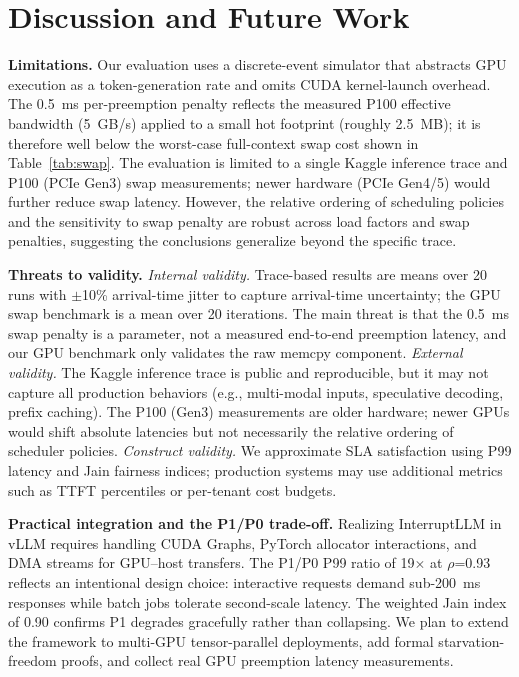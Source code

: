 \documentclass[conference]{IEEEtran}
\begin{document}
\section{Discussion and Future Work}\label{sec:discussion}

\textbf{Limitations.} Our evaluation uses a discrete-event simulator that abstracts GPU execution as a token-generation rate and omits CUDA kernel-launch overhead. The 0.5~ms per-preemption penalty reflects the measured P100 effective bandwidth (5~GB/s) applied to a small hot footprint (roughly 2.5~MB); it is therefore well below the worst-case full-context swap cost shown in Table~\ref{tab:swap}. The evaluation is limited to a single Kaggle inference trace and P100 (PCIe Gen3) swap measurements; newer hardware (PCIe Gen4/5) would further reduce swap latency. However, the relative ordering of scheduling policies and the sensitivity to swap penalty are robust across load factors and swap penalties, suggesting the conclusions generalize beyond the specific trace.

\textbf{Threats to validity.}
\textit{Internal validity.} Trace-based results are means over 20 runs with $\pm$10\% arrival-time jitter to capture arrival-time uncertainty; the GPU swap benchmark is a mean over 20 iterations. The main threat is that the 0.5~ms swap penalty is a parameter, not a measured end-to-end preemption latency, and our GPU benchmark only validates the raw memcpy component.
\textit{External validity.} The Kaggle inference trace is public and reproducible, but it may not capture all production behaviors (e.g., multi-modal inputs, speculative decoding, prefix caching). The P100 (Gen3) measurements are older hardware; newer GPUs would shift absolute latencies but not necessarily the relative ordering of scheduler policies.
\textit{Construct validity.} We approximate SLA satisfaction using P99 latency and Jain fairness indices; production systems may use additional metrics such as TTFT percentiles or per-tenant cost budgets.

\textbf{Practical integration and the P1/P0 trade-off.} Realizing InterruptLLM in vLLM requires handling CUDA Graphs, PyTorch allocator interactions, and DMA streams for GPU--host transfers. The P1/P0 P99 ratio of 19$\times$ at $\rho$=0.93 reflects an intentional design choice: interactive requests demand sub-200~ms responses while batch jobs tolerate second-scale latency. The weighted Jain index of 0.90 confirms P1 degrades gracefully rather than collapsing. We plan to extend the framework to multi-GPU tensor-parallel deployments, add formal starvation-freedom proofs, and collect real GPU preemption latency measurements.
\end{document}
